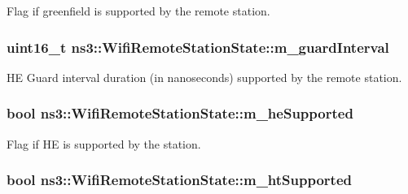 Flag if greenfield is supported by the remote station. 

\subsubsection[{\texorpdfstring{m\+\_\+guard\+Interval}{m_guardInterval}}]{\setlength{\rightskip}{0pt plus 5cm}uint16\+\_\+t ns3\+::\+Wifi\+Remote\+Station\+State\+::m\+\_\+guard\+Interval}\hypertarget{structns3_1_1WifiRemoteStationState_a9e41a4074f9a7d5a61be765d53abcd6f}{}\label{structns3_1_1WifiRemoteStationState_a9e41a4074f9a7d5a61be765d53abcd6f}


HE Guard interval duration (in nanoseconds) supported by the remote station. 

\subsubsection[{\texorpdfstring{m\+\_\+he\+Supported}{m_heSupported}}]{\setlength{\rightskip}{0pt plus 5cm}bool ns3\+::\+Wifi\+Remote\+Station\+State\+::m\+\_\+he\+Supported}\hypertarget{structns3_1_1WifiRemoteStationState_a5b290a2914cbd4f98ac6582b966457c2}{}\label{structns3_1_1WifiRemoteStationState_a5b290a2914cbd4f98ac6582b966457c2}


Flag if HE is supported by the station. 

\subsubsection[{\texorpdfstring{m\+\_\+ht\+Supported}{m_htSupported}}]{\setlength{\rightskip}{0pt plus 5cm}bool ns3\+::\+Wifi\+Remote\+Station\+State\+::m\+\_\+ht\+Supported}\hypertarget{structns3_1_1WifiRemoteStationState_a3ccb6120a00ab4615366750adee598a8}{}\label{structns3_1_1WifiRemoteStationState_a3ccb6120a00ab4615366750adee598a8}


